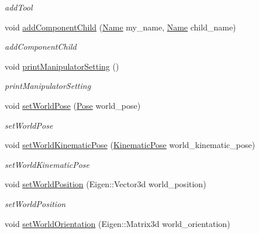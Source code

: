 \begin{DoxyCompactItemize}
\begin{DoxyCompactList}\small\item\em add\+Tool \end{DoxyCompactList}\item 
void \hyperlink{classrobotis__manipulator_1_1_manipulator_aa26790929f153a49180239f3ac82338f}{add\+Component\+Child} (\hyperlink{namespacerobotis__manipulator_a08c2d25e77a01ad75b9bb740f8ce4765}{Name} my\+\_\+name, \hyperlink{namespacerobotis__manipulator_a08c2d25e77a01ad75b9bb740f8ce4765}{Name} child\+\_\+name)
\begin{DoxyCompactList}\small\item\em add\+Component\+Child \end{DoxyCompactList}\item 
void \hyperlink{classrobotis__manipulator_1_1_manipulator_a4905d7e23cba50ee7c518d078774efe8}{print\+Manipulator\+Setting} ()
\begin{DoxyCompactList}\small\item\em print\+Manipulator\+Setting \end{DoxyCompactList}\item 
void \hyperlink{classrobotis__manipulator_1_1_manipulator_a0a6290aa7c975c78e0d024be9bedd802}{set\+World\+Pose} (\hyperlink{structrobotis__manipulator_1_1_pose}{Pose} world\+\_\+pose)
\begin{DoxyCompactList}\small\item\em set\+World\+Pose \end{DoxyCompactList}\item 
void \hyperlink{classrobotis__manipulator_1_1_manipulator_a2e6c5c86669eff458be6bbd0c960f0cf}{set\+World\+Kinematic\+Pose} (\hyperlink{structrobotis__manipulator_1_1_kinematic_pose}{Kinematic\+Pose} world\+\_\+kinematic\+\_\+pose)
\begin{DoxyCompactList}\small\item\em set\+World\+Kinematic\+Pose \end{DoxyCompactList}\item 
void \hyperlink{classrobotis__manipulator_1_1_manipulator_a7e07c0d513fbac5e758280a3105543d9}{set\+World\+Position} (Eigen\+::\+Vector3d world\+\_\+position)
\begin{DoxyCompactList}\small\item\em set\+World\+Position \end{DoxyCompactList}\item 
void \hyperlink{classrobotis__manipulator_1_1_manipulator_aeb2ca276081f334d2dcdd8808660189d}{set\+World\+Orientation} (Eigen\+::\+Matrix3d world\+\_\+orientation)

\end{DoxyCompactItemize}
